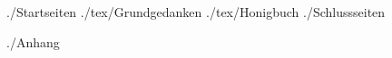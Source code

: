 \documentclass[12pt,a4paper]{scrartcl}
\begin{document}
 {./Startseiten}
 {./tex/Grundgedanken}
 {./tex/Honigbuch}
 {./Schlussseiten}

\printindex

 {./Anhang}
\end{document}

